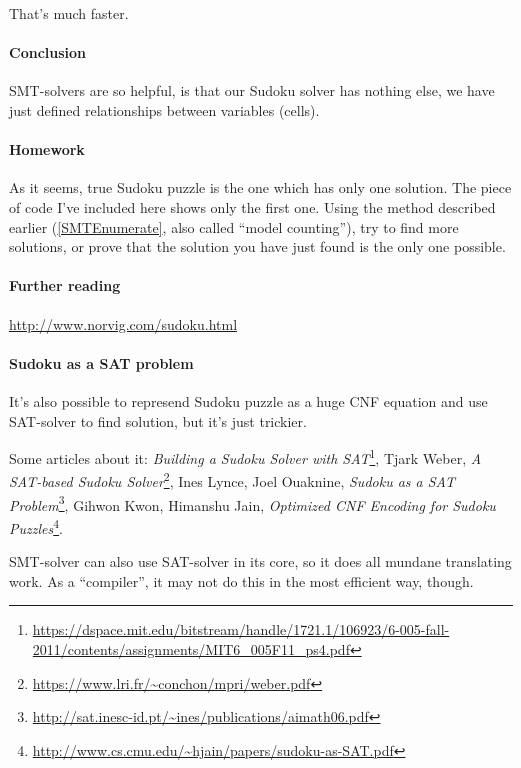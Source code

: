 That's much faster.

\paragraph{Conclusion}

\ac{SMT}-solvers are so helpful, is that our Sudoku solver has nothing else, we have just defined relationships between variables (cells).

\paragraph{Homework}

As it seems, true Sudoku puzzle is the one which has only one solution.
The piece of code I've included here shows only the first one.
Using the method described earlier (\ref{SMTEnumerate}, also called ``model counting''), 
try to find more solutions, or prove that the solution you have just found is the only one possible.

\paragraph{Further reading}

\url{http://www.norvig.com/sudoku.html}

\paragraph{Sudoku as a \ac{SAT} problem}

It's also possible to represend Sudoku puzzle as a huge \ac{CNF} equation and use \ac{SAT}-solver to find solution, but it's just trickier.

Some articles about it:
\textit{Building a Sudoku Solver with SAT}\footnote{\url{https://dspace.mit.edu/bitstream/handle/1721.1/106923/6-005-fall-2011/contents/assignments/MIT6_005F11_ps4.pdf}},
Tjark Weber, \textit{A SAT-based Sudoku Solver}\footnote{\url{https://www.lri.fr/~conchon/mpri/weber.pdf}},
Ines Lynce, Joel Ouaknine, \textit{Sudoku as a SAT Problem}\footnote{\url{http://sat.inesc-id.pt/~ines/publications/aimath06.pdf}},
Gihwon Kwon, Himanshu Jain, \textit{Optimized CNF Encoding for Sudoku Puzzles}\footnote{\url{http://www.cs.cmu.edu/~hjain/papers/sudoku-as-SAT.pdf}}.

\ac{SMT}-solver can also use \ac{SAT}-solver in its core, so it does all mundane translating work.
As a ``compiler'', it may not do this in the most efficient way, though.

